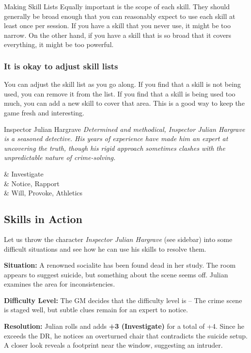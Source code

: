 \begin{multicols}{2}
\begin{CommentBox}{Making Skill Lists}
		Equally important is the scope of each skill. They should generally be broad enough that you can reasonably expect to use each skill at least once per session. If you have a skill that you never use, it might be too narrow. On the other hand, if you have a skill that is so broad that it covers everything, it might be too powerful.

		\subsubsection*{It is okay to adjust skill lists}
		You can adjust the skill list as you go along. If you find that a skill is not being used, you can remove it from the list. If you find that a skill is being used too much, you can add a new skill to cover that area. This is a good way to keep the game fresh and interesting.
	\end{CommentBox}

	\begin{NPC}{Inspector Julian Hargrave}
		\emph{Determined and methodical, Inspector Julian Hargrave is a seasoned detective. His years of experience have made him an expert at uncovering the truth, though his rigid approach sometimes clashes with the unpredictable nature of crime-solving.}

		\vspace{0.5\baselineskip}
		\begin{SkillsBox}
			\Expert & Investigate \\
			\Skilled & Notice, Rapport \\
			\Novice & Will, Provoke, Athletics \\
		\end{SkillsBox}
	\end{NPC}


	\end{multicols}

\EndBoxPage

\subsection{Skills in Action}

Let us throw the character \emph{Inspector Julian Hargrave} (see sidebar) into some difficult situations and see how he can use his skills to resolve them.

\begin{Example}
	\textbf{Situation:} A renowned socialite has been found dead in her study. The room appears to suggest suicide, but something about the scene seems off. Julian examines the area for inconsistencies.

	\noindent
	\textbf{Difficulty Level:} The GM decides that the difficulty level is \Formidable – The crime scene is staged well, but subtle clues remain for an expert to notice.

	\noindent
	\textbf{Resolution:} Julian rolls  and adds \textbf{+3 (Investigate)} for a total of +4. Since he exceeds the DR, he notices an overturned chair that contradicts the suicide setup. A closer look reveals a footprint near the window, suggesting an intruder.
\end{Example}


